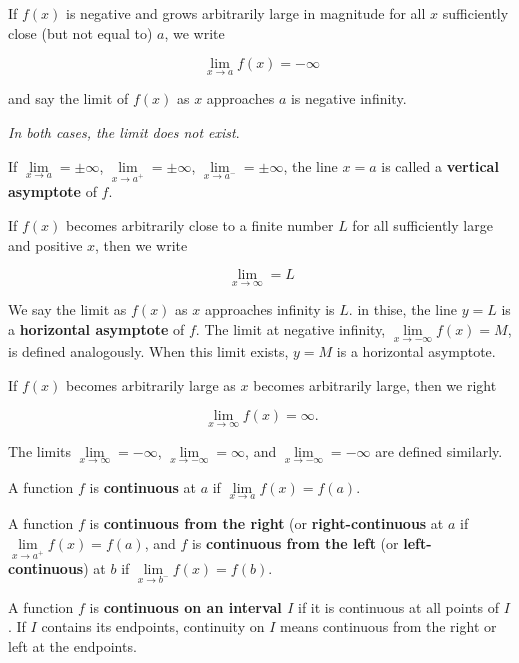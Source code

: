 \par If $f(x)$ is negative and grows arbitrarily large in magnitude for
all $x$ sufficiently close (but not equal to) $a$, we write

$$\
\lim_{x \to a} f(x) = -\infty
$$

and say the limit of $f(x)$ as $x$ approaches $a$ is
negative infinity.

{\it In both cases, the limit does not exist}.

\enddef

If
$\lim\limits_{x \to a} = \pm \infty$, 
$\lim\limits_{x \to a^+} = \pm \infty$, 
$\lim\limits_{x \to a^-} = \pm \infty$,
the line $x = a$ is called a {\bf vertical asymptote}
of $f$.
\enddef

If $f(x)$ becomes arbitrarily close to a finite number $L$
for all sufficiently large and positive $x$, then we
write

$$\
\lim_{x \to \infty} = L
$$

We say the limit as $f(x)$ as $x$ approaches infinity
is $L$. in thise, the line $y = L$ is a {\bf horizontal asymptote}
of $f$. The limit at negative infinity, $\lim\limits_{x \to -\infty} f(x) = M$,
is defined analogously. When this limit exists, $y = M$ is a horizontal
asymptote.
\enddef

If $f(x)$ becomes arbitrarily large as $x$ becomes arbitrarily
large, then we right

$$\
\lim_{x \to \infty} f(x) = \infty.
$$

The limits
$\lim\limits_{x \to \infty} = -\infty$,
$\lim\limits_{x \to -\infty} = \infty$,
and
$\lim\limits_{x \to -\infty} = -\infty$
are defined similarly.
\enddef

A function $f$ is {\bf continuous} at $a$ if $\lim\limits_{x \to a}
f(x) = f(a)$.
\enddef

A function $f$ is {\bf continuous from the right} (or
{\bf right-continuous} at $a$ if $\lim\limits_{x \to a^+} f(x) = f(a)$,
and $f$ is {\bf continuous from the left} (or {\bf left-continuous}) at $b$
if $\lim\limits_{x \to b^-} f(x) = f(b)$.
\enddef

A function $f$ is {\bf continuous on an interval $I$} if
it is continuous at all points of $I$. If $I$ contains its
endpoints, continuity on $I$ means continuous from the
right or left at the endpoints.
\enddef

